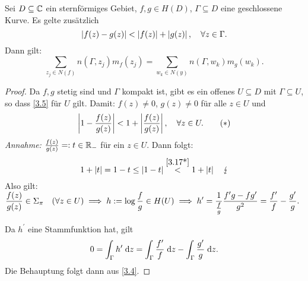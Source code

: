 \documentclass[a4paper,twoside,DIV15,BCOR12mm]{scrbook}
\begin{document}
\begin{kor}[Rouch\'e]\label{kor3.17}
Sei $D\subseteq\mathbb{C}$ ein sternförmiges Gebiet, $f,g\in H(D)$, $\Gamma\subseteq D$ eine geschlossene Kurve. Es gelte zusätzlich
\begin{equation}\label{3.5}
\left\lvert f(z)-g(z)\right\lvert<\left\lvert f(z)\right\lvert+\left\lvert g(z)\right\lvert,\quad\forall z\in\Gamma.
\end{equation}
Dann gilt:
\[\sum_{z_j\in N(f)}\!\!\!\!\! n(\Gamma,z_j)m_f(z_j) =\!\!\!\!\!\!\sum_{w_k\in N(y)}\!\!\!\!\!n(\Gamma,w_k)m_g(w_k).\]
\end{kor}
\begin{proof} Da $f,g$ stetig sind und $\Gamma$ kompakt ist, gibt es ein offenes $U\subseteq D$ mit $\Gamma\subseteq U$, so dass \eqref{3.5} für $U$ gilt. Damit: $f(z)\neq 0$, $g(z)\neq 0$ für alle $z\in U$ und
\[\label{3.17*}\left\lvert1-\frac{f(z)}{g(z)}\right\lvert < 1 + \left\lvert\frac{f(z)}{g(z)}\right\lvert,\quad\forall z\in U.\tag{$*$}\]
\textit{Annahme:} $\frac{f(z)}{g(z)} =: t \in \mathbb{R}_-$ für ein $z\in U$. Dann folgt:
\[1+\left\lvert t\right\lvert = 1-t \leq \left\lvert1-t\right\lvert \overset{\eqref{3.17*}}{<} 1 + \left\lvert t\right\lvert\quad\lightning\]
Also gilt: $\displaystyle\frac{f(z)}{g(z)}\in\Sigma_\pi\quad(\forall z\in U)\implies h:=\log\frac{f}{g}\in H(U)\implies h^\prime = \frac{1}{\frac{f}{g}}\frac{f^\prime g - fg^\prime}{g^2} = \frac{f^\prime}{f}-\frac{g^\prime}{g}.$

Da $h^\prime$ eine Stammfunktion hat, gilt
\[0 = \int_{\Gamma}^{}{h^\prime}\;\mathrm{d} z = \int_{\Gamma}^{}{\frac{f^\prime}{f}}\;\mathrm{d} z-\int_{\Gamma}^{}{\frac{g^\prime}{g}}\;\mathrm{d} z.\]
Die Behauptung folgt dann aus \eqref{3.4}.
\end{proof}
\end{document}
